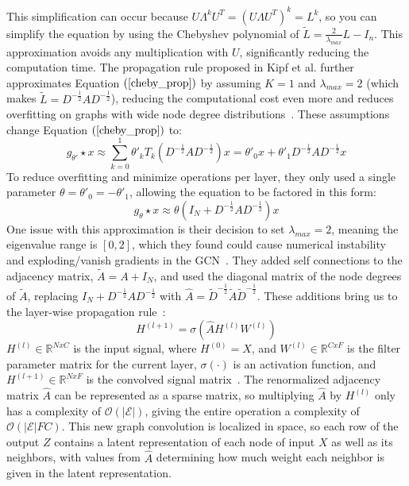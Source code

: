 This simplification can occur because $U \Lambda^k U^T = (U \Lambda U^T)^k = L^k $, so you can simplify the equation by using the Chebyshev polynomial of $\tilde{L} = \frac{2}{\lambda_{max}} L - I_n$. This approximation avoids any multiplication with $U$, significantly reducing the computation time. The propagation rule proposed in Kipf et al. further approximates Equation $(\ref{cheby_prop})$ by assuming $K = 1$ and $\lambda_{max} = 2$ (which makes $\tilde{L} = D^{-\frac{1}{2}}AD^{-\frac{1}{2}}$), reducing the computational cost even more and reduces overfitting on graphs with wide node degree distributions~\cite{Kipf2016}. These assumptions change Equation $(\ref{cheby_prop})$ to:
\begin{equation}
\label{reduce_k}
g_{\theta'} \star x \approx \sum\limits_{k=0}^{1} \theta'_k T_k (D^{-\frac{1}{2}}AD^{-\frac{1}{2}})x = \theta'_0x + \theta'_1 D^{-\frac{1}{2}}AD^{-\frac{1}{2}}x 
\end{equation}
To reduce overfitting and minimize operations per layer, they only used a single parameter $\theta = \theta'_0 = -\theta'_1$, allowing the equation to be factored in this form:
\begin{equation}
\label{single_param}
g_\theta \star x \approx \theta(I_N + D^{-\frac{1}{2}}AD^{-\frac{1}{2}})x
\end{equation}
One issue with this approximation is their decision to set $\lambda_{max} = 2$, meaning the eigenvalue range is $[0,2]$, which they found could cause numerical instability and exploding/vanish gradients in the GCN~\cite{Kipf2016}. They added self connections to the adjacency matrix, $\tilde{A} = A + I_N$, and used the diagonal matrix of the node degrees of $\tilde{A}$, replacing $I_N + D^{-\frac{1}{2}}AD^{-\frac{1}{2}}$ with $\hat{A} = \tilde{D}^{-\frac{1}{2}}\tilde{A}\tilde{D}^{-\frac{1}{2}}$. These additions bring us to the layer-wise propagation rule~\cite{Kipf2016}:
\begin{equation}
\label{prop_rule}
H^{(l+1)} = \sigma(\hat{A}H^{(l)}W^{(l)})
\end{equation}
$H^{(l)} \in \mathbb{R}^{N x C}$ is the input signal, where $H^{(0)} = X$, and $W^{(l)} \in \mathbb{R}^{C x F}$ is the filter parameter matrix for the current layer, $\sigma(\cdot)$ is an activation function, and $H^{(l+1)} \in \mathbb{R}^{N x F}$ is the convolved signal matrix~\cite{Kipf2016}. The renormalized adjacency matrix $\hat{A}$ can be represented as a sparse matrix, so multiplying $\hat{A}$ by $H^{(l)}$ only has a complexity of $\mathcal{O}(|\mathcal{E}|)$, giving the entire operation a complexity of $\mathcal{O}(|\mathcal{E}|FC)$.  This new graph convolution is localized in space, so each row of the output $Z$ contains a latent representation of each node of input $X$ as well as its neighbors, with values from $\hat{A}$ determining how much weight each neighbor is given in the latent representation.

